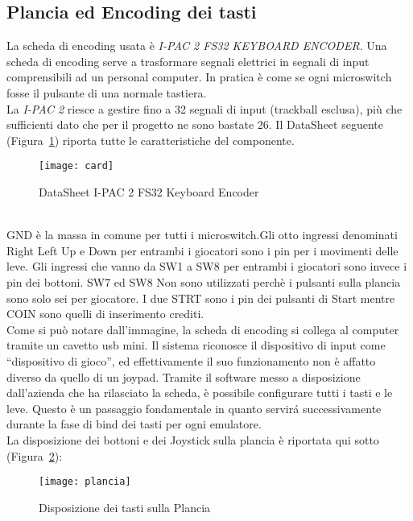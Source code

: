 \subsection{ Plancia ed Encoding dei tasti}
La scheda di encoding usata è \textit{I-PAC 2 FS32 KEYBOARD ENCODER}. Una scheda di encoding serve a trasformare segnali elettrici in segnali di input comprensibili ad un personal computer. In pratica è come se ogni microswitch fosse il pulsante di una normale tastiera.\\La \textit{I-PAC 2} riesce a gestire fino a 32 segnali di input (trackball esclusa), più che sufficienti dato che per il progetto ne sono bastate 26. Il DataSheet seguente (Figura~\ref{fig:ke}) riporta tutte le caratteristiche del componente.\\
\begin{figure}[!ht]
\texttt{[image: card]}
\centering
\caption{DataSheet I-PAC 2 FS32 Keyboard Encoder}
\label{fig:ke}
\end{figure}
\\GND è la massa in comune per tutti i microswitch.Gli otto ingressi denominati Right Left Up e Down per entrambi i giocatori sono i pin per i movimenti delle leve. Gli ingressi che vanno da SW1 a SW8 per entrambi i giocatori sono invece i pin dei bottoni. SW7 ed SW8 Non sono utilizzati perchè i pulsanti sulla plancia sono solo sei per giocatore. I due STRT sono i pin dei pulsanti di Start mentre COIN sono quelli di inserimento crediti.\\Come si può notare dall’immagine, la scheda di encoding si collega al computer tramite un cavetto usb mini. Il sistema riconosce il dispositivo di input come “dispositivo di gioco”, ed effettivamente il suo funzionamento non è affatto diverso da quello di un joypad. Tramite il software messo a disposizione dall'azienda che ha rilasciato la scheda, è possibile configurare tutti i tasti e le leve. Questo è un passaggio fondamentale in quanto servirá successivamente durante la fase di bind dei tasti per ogni emulatore.\\La disposizione dei bottoni e dei Joystick sulla plancia è riportata qui sotto (Figura~\ref{fig:plancia}):\\
\begin{figure}[!ht]
\texttt{[image: plancia]}
\centering
\caption{Disposizione dei tasti sulla Plancia }
\label{fig:plancia}
\end{figure}
\newpage

